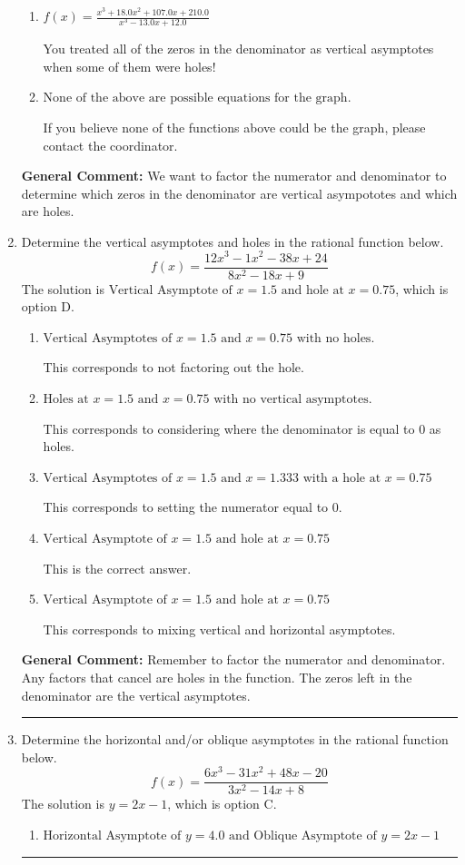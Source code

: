 \documentclass{extbook}[14pt]
\newcommand{\litem}[1]{\item #1

\rule{\textwidth}{0.4pt}}
\begin{document}
\begin{enumerate}
{\begin{enumerate}[label=\Alph*.]
Remember that factors are written as $x-z$. For example, the zero $x=-4$ corresponds to the factor $x-(-4)$.
\item \( f(x)=\frac{x^{3} +18.0 x^{2} +107.0 x + 210.0}{x^{3} -13.0 x + 12.0} \)

You treated all of the zeros in the denominator as vertical asymptotes when some of them were holes!
\item \( \text{None of the above are possible equations for the graph.} \)

If you believe none of the functions above could be the graph, please contact the coordinator.
\end{enumerate}

\textbf{General Comment:} We want to factor the numerator and denominator to determine which zeros in the denominator are vertical asympototes and which are holes.
}
\litem{
Determine the vertical asymptotes and holes in the rational function below.
\[ f(x) = \frac{12x^{3} -1 x^{2} -38 x + 24}{8x^{2} -18 x + 9} \]The solution is \( \text{Vertical Asymptote of } x = 1.5 \text{ and hole at } x = 0.75 \), which is option D.\begin{enumerate}[label=\Alph*.]
\item \( \text{Vertical Asymptotes of } x = 1.5 \text{ and } x = 0.75 \text{ with no holes.} \)

This corresponds to not factoring out the hole.
\item \( \text{Holes at } x = 1.5 \text{ and } x = 0.75 \text{ with no vertical asymptotes.} \)

This corresponds to considering where the denominator is equal to 0 as holes.
\item \( \text{Vertical Asymptotes of } x = 1.5 \text{ and } x = 1.333 \text{ with a hole at } x = 0.75 \)

This corresponds to setting the numerator equal to 0.
\item \( \text{Vertical Asymptote of } x = 1.5 \text{ and hole at } x = 0.75 \)

This is the correct answer.
\item \( \text{Vertical Asymptote of } x = 1.5 \text{ and hole at } x = 0.75 \)

This corresponds to mixing vertical and horizontal asymptotes.
\end{enumerate}

\textbf{General Comment:} Remember to factor the numerator and denominator. Any factors that cancel are holes in the function. The zeros left in the denominator are the vertical asymptotes.
}
\litem{
Determine the horizontal and/or oblique asymptotes in the rational function below.
\[ f(x) = \frac{6x^{3} -31 x^{2} +48 x -20}{3x^{2} -14 x + 8} \]The solution is \( y = 2x -1 \), which is option C.\begin{enumerate}[label=\Alph*.]
\item \( \text{Horizontal Asymptote of } y = 4.0 \text{ and Oblique Asymptote of } y = 2x -1 \)


\end{enumerate}}
\end{enumerate}
\end{document}
